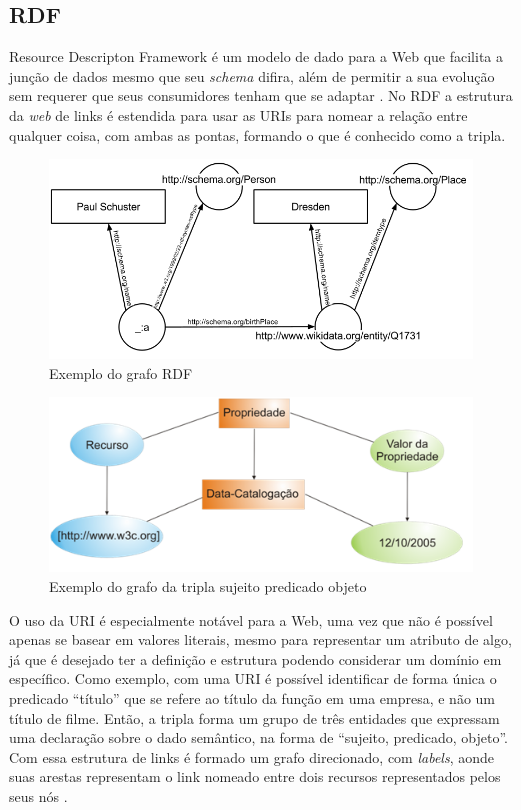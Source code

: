 \subsection{RDF}

Resource Descripton Framework é um modelo de dado para a Web que facilita a junção de dados mesmo que seu \textit{schema} difira, além de permitir a sua evolução sem requerer que seus consumidores tenham que se adaptar \citep{W3CRDF}. No RDF a estrutura da \textit{web} de links é estendida para usar as URIs para nomear a relação entre qualquer coisa, com ambas as pontas, formando o que é conhecido como a tripla.

\begin{figure}
	\centering
	\includegraphics[scale=0.40]{imagens/rdf_example1.png}
	\caption{Exemplo do grafo RDF \citep{RDFWikiImage}}
	\label{fig:rdf_graph}
\end{figure}

\begin{figure}
	\centering
	\includegraphics[scale=0.65]{imagens/rdf_example2.png}
	\caption{Exemplo do grafo da tripla sujeito predicado objeto \citep{WebSemanticaDevmedia}}
	\label{fig:rdf_graph2}
\end{figure}

O uso da URI é especialmente notável para a Web, uma vez que não é possível apenas se basear em valores literais, mesmo para representar um atributo de algo, já que é desejado ter a definição e estrutura podendo considerar um domínio em específico. Como exemplo, com uma URI é possível identificar de forma única o predicado “título” que se refere ao título da função em uma empresa, e não um título de filme. Então, a tripla forma um grupo de três entidades que expressam uma declaração sobre o dado semântico, na forma de “sujeito, predicado, objeto”. Com essa estrutura de links é formado um grafo direcionado, com \textit{labels}, aonde suas arestas representam o link nomeado entre dois recursos representados pelos seus nós \citep{W3CRDF}.

